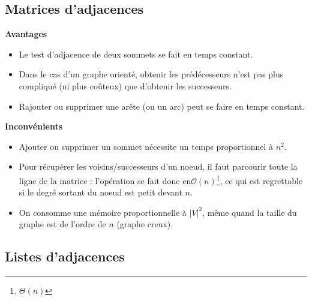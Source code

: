\subsection{Matrices d'adjacences}

\begin{minipage}[t]{.47\linewidth}
\begin{center}
\textbf{Avantages}
\end{center}
\begin{itemize}
\item Le test d’adjacence de deux sommets se fait en temps constant.
\item Dans le cas d’un graphe orienté, obtenir les prédécesseurs n’est pas plus compliqué (ni plus coûteux)
que d’obtenir les successeurs.
\item Rajouter ou supprimer une arête (ou un arc) peut se faire en temps constant.
\end{itemize}
\end{minipage}
\hfill
\begin{minipage}[t]{.47\linewidth}
\begin{center}
\textbf{Inconvénients}
\begin{itemize}
\item Ajouter ou supprimer un sommet nécessite un temps proportionnel à $n^2$.
\item Pour récupérer les voisins/successeurs d’un noeud, il faut parcourir toute la ligne de la matrice :
l’opération se fait donc en$\mathcal{O}(n)$\footnote{$\Theta(n)$}, ce qui est regrettable si le degré sortant du noeud est petit devant $n$.
\item On consomme une mémoire proportionnelle à $|V|^2$, même quand la taille du graphe est de l’ordre de $n$ (graphe creux).
\end{itemize}
\end{center}
\end{minipage}

\subsection{Listes d'adjacences}

